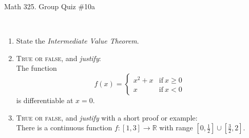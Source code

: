 \documentclass[12pt]{amsart}
\newcommand{\R}{\mathbb{R}}
\begin{document}
	
	\thispagestyle{empty}
	
	\begin{center}
		\Large{Math 325. Group Quiz \#10a }\\

	\end{center}
	
	\
	
\begin{enumerate}
		\item State the \textit{Intermediate Value Theorem}. 
		\vfill
		\vfill



\item  \textsc{True or false}, and \emph{justify}:\\
 The function 
 \[ f(x) = \begin{cases} x^2 + x & \text{if} \ x\geq 0 \\ x & \text{if} \ x<0 \end{cases}\]
	is differentiable at $x=0$.
	
	
	\vfill	\vfill\vfill
	

\newpage	
	
\item  \textsc{True or false}, and \emph{justify} with a short proof or example:\\
There is a continuous function $f: [1,3] \to \R$ with range $[0,\frac{1}{2}] \cup [\frac{3}{2},2]$.

\vfill\vfill\vfill





\end{enumerate}


	
\end{document}

